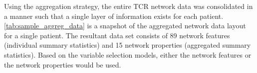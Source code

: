 Using the aggregation strategy, the entire TCR network data was consolidated in a manner such that a single layer of information exists for each patient. \autoref{tab:sample_aggreg_data} is a snapshot of the aggregated network data layout for a single patient. The resultant data set consists of 89 network features (individual summary statistics) and 15 network properties (aggregated summary statistics). Based on the variable selection models, either the network features or the network properties would be used. 

\begin{table}[H]
\caption{Aggregated Network Data Layout for a Patient}
\label{tab:sample_aggreg_data}
\end{table}

